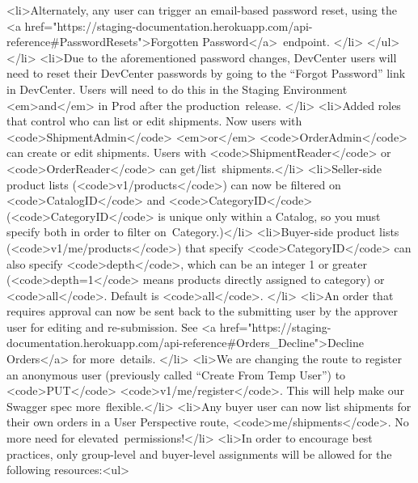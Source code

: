 \documentclass{memoir}%
\begin{document}
<li>Alternately, any user can trigger an email{-}based password reset, using the <a href="https://staging{-}documentation.herokuapp.com/api{-}reference\#PasswordResets">Forgotten Password</a>~endpoint. </li>\newline%
</ul>\newline%
</li>\newline%
<li>Due to the aforementioned password changes, DevCenter users will need to reset their DevCenter passwords by going to the “Forgot Password” link in DevCenter. Users will need to do this in the Staging Environment <em>and</em> in Prod after the production~release. </li>\newline%
<li>Added roles that control who can list or edit shipments. Now users with <code>ShipmentAdmin</code> <em>or</em> <code>OrderAdmin</code> can create or edit shipments. Users with <code>ShipmentReader</code> or <code>OrderReader</code> can get/list~shipments.</li>\newline%
<li>Seller{-}side product lists (<code>v1/products</code>) can now be filtered on <code>CatalogID</code> and <code>CategoryID</code> (<code>CategoryID</code> is unique only within a Catalog, so you must specify both in order to filter on~Category.)</li>\newline%
<li>Buyer{-}side product lists (<code>v1/me/products</code>) that specify <code>CategoryID</code> can also specify <code>depth</code>, which can be an integer 1 or greater (<code>depth=1</code> means products directly assigned to category) or <code>all</code>. Default is <code>all</code>. </li>\newline%
<li>An order that requires approval can now be sent back to the submitting user by the approver user for editing and re{-}submission. See <a href="https://staging{-}documentation.herokuapp.com/api{-}reference\#Orders\_Decline">Decline Orders</a> for more~details. </li>\newline%
<li>We are changing the route to register an anonymous user (previously called “Create From Temp User”) to <code>PUT</code> <code>v1/me/register</code>. This will help make our Swagger spec more~flexible.</li>\newline%
<li>Any buyer user can now list shipments for their own orders in a User Perspective route, <code>me/shipments</code>. No more need for elevated~permissions!</li>\newline%
<li>In order to encourage best practices, only group{-}level and buyer{-}level assignments will be allowed for the following resources:<ul>\newline%
\end{document}
